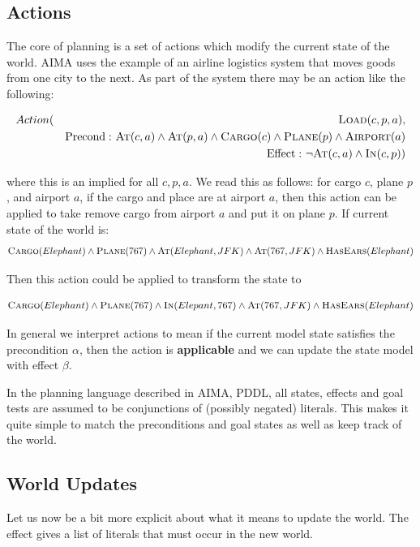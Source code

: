 \documentclass[11pt]{article}
\begin{document}
\subsection{Actions} 

The core of planning is a set of actions which modify the current state of the world. AIMA uses the example of an airline logistics system that moves goods from one city to the next. As part of the system there may be an action like the following: 

\begin{eqnarray*}
Action&(&\mathrm{\textsc{Load}}(c, p, a),  \\
&&\mathrm{Precond:}\ \mathrm{\textsc{At}}(c,a) \land \mathrm{\textsc{At}}(p, a) \land \mathrm{\textsc{Cargo}}(c) \land \mathrm{\textsc{Plane}}(p) \land \mathrm{\textsc{Airport}}(a)\\
&&\mathrm{Effect:}\ \lnot \mathrm{\textsc{At}}(c,a) \land \mathrm{\textsc{In}}(c,p)) \\
\end{eqnarray*}

\noindent where this is an implied for all $c, p, a$. We read this as follows: for cargo $c$, plane $p$, and airport $a$, if the cargo and place are at airport $a$, then this action can be applied to take remove cargo from airport $a$ and put it on plane $p$. If current state of the world is: 
\[\mathrm{\textsc{Cargo}}(Elephant) \land \mathrm{\textsc{Plane}}(767) \land \mathrm{\textsc{At}}(Elephant, JFK) \land \mathrm{\textsc{At}}(767, JFK) \land \mathrm{\textsc{HasEars}}(Elephant)\]

Then this action could be applied to transform the state to 

\[\mathrm{\textsc{Cargo}}(Elephant) \land \mathrm{\textsc{Plane}}(767) \land \mathrm{\textsc{In}}(Elepant, 767) \land \mathrm{\textsc{At}}(767, JFK) \land \mathrm{\textsc{HasEars}}(Elephant)\]
 

\noindent In general we interpret actions to mean if the current model state satisfies the precondition $\alpha$, then the action is \textbf{applicable} and  we can update the state model with effect
$\beta$. 

In the planning language described in AIMA, PDDL, all states, effects and goal tests are assumed to be conjunctions of (possibly negated) literals. This makes it quite simple to match the preconditions and goal states as well as keep track of the world.

\subsection{World Updates}

Let us now be a bit more explicit about what it means to update the world. The effect gives a list of literals that must occur in the new world. 
\end{document}
